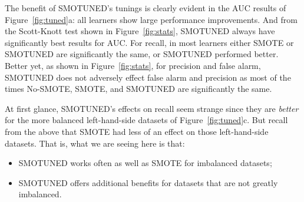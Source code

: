 \documentclass[10pt,conference]{IEEEtran}
\newcommand{\bi}{\begin{itemize}[leftmargin=0.4cm]}
\newcommand{\ei}{\end{itemize}}
\theoremstyle{break}
\theoremstyle{break}
\begin{document}
The benefit of SMOTUNED's tunings is clearly evident in the AUC results of  Figure~\ref{fig:tuned}a:
all learners show large performance improvements. And from the Scott-Knott test shown in Figure~\ref{fig:stats}, SMOTUNED always have significantly best results for AUC. For recall, in most learners either SMOTE or SMOTUNED are significantly the same, or SMOTUNED performed better. 
Better yet,  as
shown in
Figure~\ref{fig:stats}, for precision and false alarm, SMOTUNED does
not adversely effect false alarm and precision as most of the times No-SMOTE, SMOTE, and SMOTUNED are significantly the same.


At first glance, SMOTUNED's effects on recall seem strange since they are
{\em better} for the more balanced left-hand-side datasets of
Figure~\ref{fig:tuned}c.  But recall from the above that SMOTE had less
of an effect on those left-hand-side datasets. That is, what we are seeing
here is that:
\bi
\item
SMOTUNED works often as well as SMOTE for imbalanced datasets;
\item
SMOTUNED offers additional benefits for datasets that are not greatly
imbalanced.
\ei




\end{document}
